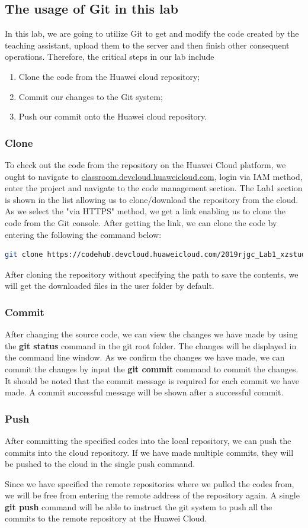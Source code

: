 \documentclass[a4paper]{report}
\begin{document}
\subsection{The usage of Git in this lab}
In this lab, we are going to utilize Git to get and modify the code created by the teaching assistant, upload them to the server and then finish other consequent operations. Therefore, the critical steps in our lab include
\begin{enumerate}
  \item Clone the code from the Huawei cloud repository;
  \item Commit our changes to the Git system;
  \item Push our commit onto the Huawei cloud repository.
\end{enumerate}
\subsubsection{Clone}
To check out the code from the repository on the Huawei Cloud platform, we ought to navigate to \url{classroom.devcloud.huaweicloud.com}, login via IAM method, enter the project and navigate to the code management section. The Lab1 section is shown in the list allowing us to clone/download the repository from the cloud. As we select the "via HTTPS" method, we get a link enabling us to clone the code from the Git console.
After getting the link, we can clone the code by entering the following the command below:
\begin{lstlisting}[language=bash]
git clone https://codehub.devcloud.huaweicloud.com/2019rjgc_Lab1_xzstudent00300001/Lab1.git
\end{lstlisting}
\par
After cloning the repository without specifying the path to save the contents, we will get the downloaded files in the user folder by default.
\subsubsection{Commit}
After changing the source code, we can view the changes we have made by using the \textbf{git status} command in the git root folder. The changes will be displayed in the command line window. As we confirm the changes we have made, we can commit the changes by input the \textbf{git commit} command to commit the changes. It should be noted that the commit message is required for each commit we have made. A commit successful message will be shown after a successful commit.
\subsubsection{Push}
After committing the specified codes into the local repository, we can push the commits into the cloud repository. If we have made multiple commits, they will be pushed to the cloud in the single push command.
\par
Since we have specified the remote repositories where we pulled the codes from, we will be free from entering the remote address of the repository again. A single \textbf{git push} command will be able to instruct the git system to push all the commits to the remote repository at the Huawei Cloud.
\end{document}
